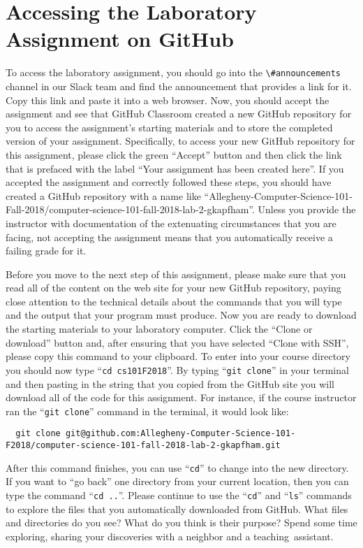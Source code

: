\documentclass[11pt]{article}
\newcommand{\command}[1]{``\lstinline{#1}''}
\newcommand{\channel}[1]{\lstinline{#1}}
\newcommand{\step}[1]{``{#1}''}
\begin{document}
\section*{Accessing the Laboratory Assignment on GitHub}

To access the laboratory assignment, you should go into the
\channel{\#announcements} channel in our Slack team and find the announcement
that provides a link for it. Copy this link and paste it into a web browser.
Now, you should accept the assignment and see that GitHub Classroom created a
new GitHub repository for you to access the assignment's starting materials and
to store the completed version of your assignment. Specifically, to access your
new GitHub repository for this assignment, please click the green ``Accept''
button and then click the link that is prefaced with the label ``Your
assignment has been created here''. If you accepted the assignment and
correctly followed these steps, you should have created a GitHub repository
with a name like
``Allegheny-Computer-Science-101-Fall-2018/computer-science-101-fall-2018-lab-2-gkapfham''.
Unless you provide the instructor with documentation of the extenuating
circumstances that you are facing, not accepting the assignment means that you
automatically receive a failing grade for it.

Before you move to the next step of this assignment, please make sure that you
read all of the content on the web site for your new GitHub repository, paying
close attention to the technical details about the commands that you will type
and the output that your program must produce. Now you are ready to download the
starting materials to your laboratory computer. Click the ``Clone or download''
button and, after ensuring that you have selected ``Clone with SSH'', please
copy this command to your clipboard. To enter into your course directory you
should now type \command{cd cs101F2018}. By typing \command{git clone} in your
terminal and then pasting in the string that you copied from the GitHub site you
will download all of the code for this assignment. For instance, if the course
instructor ran the \command{git clone} command in the terminal, it would look
like:

\begin{lstlisting}
  git clone git@github.com:Allegheny-Computer-Science-101-F2018/computer-science-101-fall-2018-lab-2-gkapfham.git
\end{lstlisting}

After this command finishes, you can use \command{cd} to change into the new
directory. If you want to \step{go back} one directory from your current
location, then you can type the command \command{cd ..}. Please continue to use
the \command{cd} and \command{ls} commands to explore the files that you
automatically downloaded from GitHub. What files and directories do you see?
What do you think is their purpose? Spend some time exploring, sharing your
discoveries with a neighbor and a \mbox{teaching assistant}.
\end{document}
